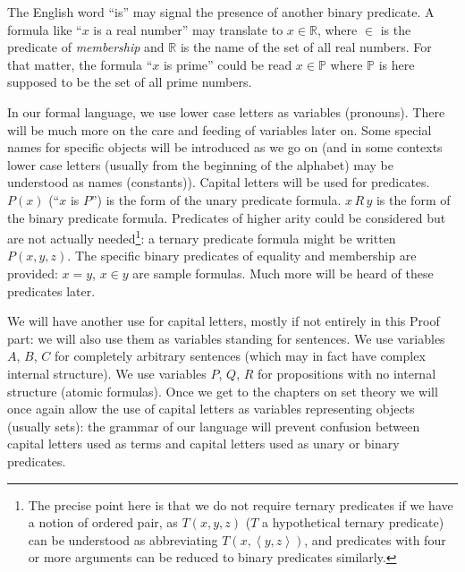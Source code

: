 \documentclass[12pt]{book}
\begin{document}
The English word ``is'' may signal the presence of another binary
predicate.  A formula like ``$x$ is a real number'' may translate to
$x \in {\mathbb R}$, where $\in$ is the predicate of {\em
membership\/} and ${\mathbb R}$ is the name of the set of all real
numbers.  For that matter, the formula ``$x$ is prime'' could be read
$x \in {\mathbb P}$ where ${\mathbb P}$ is here supposed to be the set
of all prime numbers.

In our formal language, we use lower case letters as variables
(pronouns).  There will be much more on the care and feeding of
variables later on.  Some special names for specific objects will be
introduced as we go on (and in some contexts lower case letters
(usually from the beginning of the alphabet) may be understood as
names (constants)).  Capital letters will be used for predicates.
$P(x)$ (``$x$ is $P$'') is the form of the unary predicate formula.
$x \, R \, y$ is the form of the binary predicate formula.  Predicates
of higher arity could be considered but are not actually needed\footnote{The precise point here is that we do not require ternary predicates if we have a notion of ordered pair, as $T(x,y,z)$ ($T$ a hypothetical ternary predicate) can be understood as abbreviating $T(x,\left<y,z\right>)$, and predicates with four or more arguments can be reduced to binary predicates similarly.}: a
ternary predicate formula might be written $P(x,y,z)$.  The specific
binary predicates of equality and membership are provided: $x=y$, $x
\in y$ are sample formulas.  Much more will be heard of these
predicates later.

We will have another use for capital letters, mostly if not entirely
in this Proof part: we will also use them as variables standing for
sentences. We use variables $A$, $B$, $C$ for completely arbitrary
sentences (which may in fact have complex internal structure).  We use
variables $P$, $Q$, $R$ for propositions with no internal structure
(atomic formulas).  Once we get to the chapters on set theory we will
once again allow the use of capital letters as variables representing
objects (usually sets):  the grammar of our language will prevent confusion between capital letters used as terms
and capital letters used as unary or binary predicates.
\end{document}
